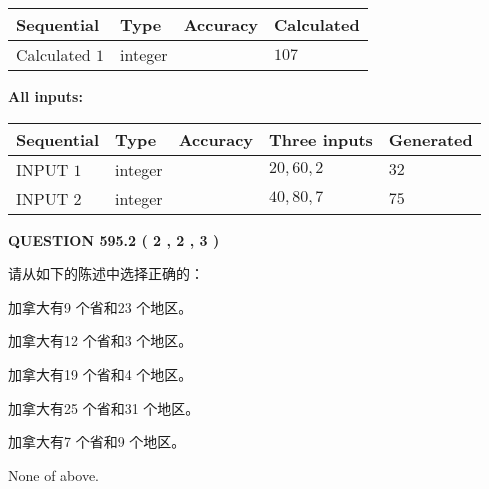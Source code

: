 \documentclass{ctexart}
\begin{document}
   
   
   
\noindent{}
   
   
  
  
\noindent\begin{tabular}{|l|l|l|l|}
\hline
 Sequential & Type & Accuracy & Calculated \\ 
\hline
 
 
  Calculated $  1 $ & integer &  & 
  $ 107 $ 
 \\  \hline  
 \end{tabular}
   
   
   
   
\noindent\vspace{0.1in}\hspace{-0.08in} {\textbf{\Large{All inputs: }}}
   
   
  
  
\noindent\begin{tabular}{|l|l|l|l|l|}
\hline
 Sequential & Type & Accuracy & Three inputs & Generated \\ 
\hline
 
 
  INPUT $  1 $ & integer &  & $
 20
 , 
 60
 , 
 2
 $ & $ 32 $ 
 \\  \hline  
 
 
  INPUT $  2 $ & integer &  & $
 40
 , 
 80
 , 
 7
 $ & $ 75 $ 
 \\  \hline  
 \end{tabular}
   
   
  
\vspace{0.2in}
  
{\textbf{\Large{QUESTION
595.2 
 ( 2 , 2 , 3 )
}}}
  
  
请从如下的陈述中选择正确的：
 
 
加拿大有9 个省和23 个地区。
 
 
加拿大有12 个省和3 个地区。
 
 
加拿大有19 个省和4 个地区。
 
 
加拿大有25 个省和31 个地区。
 
 
加拿大有7 个省和9 个地区。
 
 
 None of above.
 
 
\noindent{}
 
\end{document}
